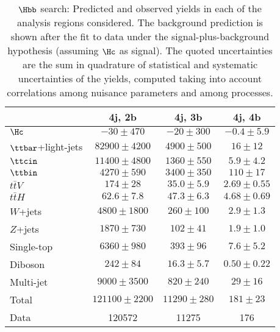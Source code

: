 \begin{table}[htbp]
\caption{
$\Hbb$ search: Predicted and observed yields in each of the analysis regions considered.
The background prediction is shown after the fit to data under the signal-plus-background hypothesis 
(assuming $\Hc$ as signal).
The quoted uncertainties are the sum in quadrature of statistical and systematic uncertainties of the yields, 
computed taking into account correlations among nuisance parameters and among processes.
}
\small
\begin{center}
\begin{tabular}{l*{3}{c}}
\hline\hline
 & 4j, 2b & 4j, 3b & 4j, 4b \\
\hline
$\Hc$  &   $ -30 \pm 470 $ &   $ -20 \pm 300 $ &   $ -0.4 \pm 5.9 $ \\ 
\hline
$\ttbar$+light-jets  &    $ 82900 \pm 4200 $ &   $ 4900 \pm 500 $ &   $ 16 \pm 12 $ \\ 
$\ttcin$  &   $ 11400 \pm 4800 $ &   $ 1360 \pm 550 $ &   $ 5.9 \pm 4.2 $ \\ 
$\ttbin$  &   $ 4270 \pm 590 $ &   $ 3400 \pm 350 $ &   $ 110 \pm 17 $ \\ 
$t\bar{t}V$  &    $ 174 \pm 28 $ &   $ 35.0 \pm 5.9 $ &   $ 2.69 \pm 0.55 $ \\ 
$t\bar{t}H$  &   $ 62.6 \pm 7.8 $ &   $ 47.3 \pm 6.3 $ &   $ 4.68 \pm 0.69 $ \\ 
$W$+jets  &   $ 4800 \pm 1800 $ &   $ 260 \pm 100 $ &   $ 2.9 \pm 1.3 $ \\ 
$Z$+jets  &    $ 1870 \pm 730 $ &   $ 102 \pm 41 $ &   $ 1.9 \pm 1.0 $ \\ 
Single-top  &  $ 6360 \pm 980 $ &   $ 393 \pm 96 $ &   $ 7.6 \pm 5.2 $ \\ 
Diboson  &   $ 242 \pm 84 $ &   $ 16.3 \pm 5.7 $ &   $ 0.50 \pm 0.22 $ \\ 
Multi-jet  &   $ 9000 \pm 3500 $ &   $ 820 \pm 240 $ &   $ 29 \pm 16 $ \\ 
\hline
Total & $ 121100 \pm 2200 $ &   $ 11290 \pm 280 $ &   $ 181 \pm 23 $ \\ 
\hline
Data & 120572  & 11275  & 176  \\ 
\hline\hline      
\end{tabular}
\vspace{0.2cm}


\end{center}
\end{table}
